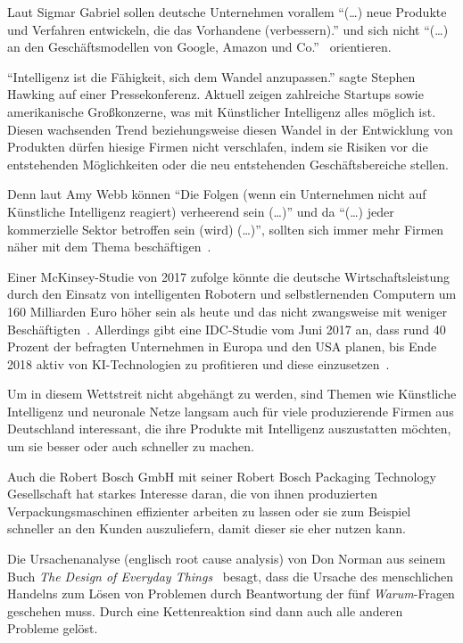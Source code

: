 Laut Sigmar Gabriel sollen deutsche Unternehmen vorallem \enquote{(\ldots) neue Produkte und Verfahren entwickeln, die
das Vorhandene (verbessern).} und sich nicht \enquote{(\ldots) an den Geschäftsmodellen von Google, Amazon und
Co.}~\cite{article_einleitung_ww_sg} orientieren.

\enquote{Intelligenz ist die Fähigkeit, sich dem Wandel anzupassen.} sagte Stephen Hawking auf einer Pressekonferenz.
Aktuell zeigen zahlreiche Startups sowie amerikanische Großkonzerne, was mit Künstlicher Intelligenz alles möglich ist.
Diesen wachsenden Trend beziehungsweise diesen Wandel in der Entwicklung von Produkten dürfen hiesige Firmen nicht
verschlafen, indem sie Risiken vor die entstehenden Möglichkeiten oder die neu entstehenden Geschäftsbereiche stellen.

Denn laut Amy Webb können \enquote{Die Folgen (wenn ein Unternehmen nicht auf Künstliche Intelligenz reagiert)
verheerend sein (\ldots)} und da \enquote{(\ldots) jeder kommerzielle Sektor betroffen sein (wird) (\ldots)}, sollten
sich immer mehr Firmen näher mit dem Thema beschäftigen~\cite{article_einleitung_dub_aw}.

Einer McKinsey-Studie von 2017 zufolge könnte die deutsche Wirtschaftsleistung durch den Einsatz von intelligenten
Robotern und selbstlernenden Computern um 160 Milliarden Euro höher sein als heute und das nicht zwangsweise mit weniger
Beschäftigten~\cite{online_einleitung_mckinsey}. Allerdings gibt eine IDC-Studie vom Juni 2017 an, dass rund 40 Prozent
der befragten Unternehmen in Europa und den USA planen, bis Ende 2018 aktiv von KI-Technologien zu profitieren und diese
einzusetzen~\cite{article_grundlagen_salesforce}.

Um in diesem Wettstreit nicht abgehängt zu werden, sind Themen wie Künstliche Intelligenz und neuronale Netze langsam
auch für viele produzierende Firmen aus Deutschland interessant, die ihre Produkte mit Intelligenz auszustatten möchten,
um sie besser oder auch schneller zu machen.

Auch die Robert Bosch GmbH mit seiner Robert Bosch Packaging Technology Gesellschaft hat starkes Interesse daran, die
von ihnen produzierten Verpackungsmaschinen effizienter arbeiten zu lassen oder sie zum Beispiel schneller an den Kunden
auszuliefern, damit dieser sie eher nutzen kann.

Die Ursachenanalyse (englisch root cause analysis) von Don Norman aus seinem Buch \textit{The Design of Everyday
Things}~\cite{book_einleitung_donnorman} besagt, dass die Ursache des menschlichen Handelns zum Lösen von Problemen
durch Beantwortung der fünf \textit{Warum}-Fragen geschehen muss. Durch eine Kettenreaktion sind dann auch alle anderen
Probleme gelöst.

